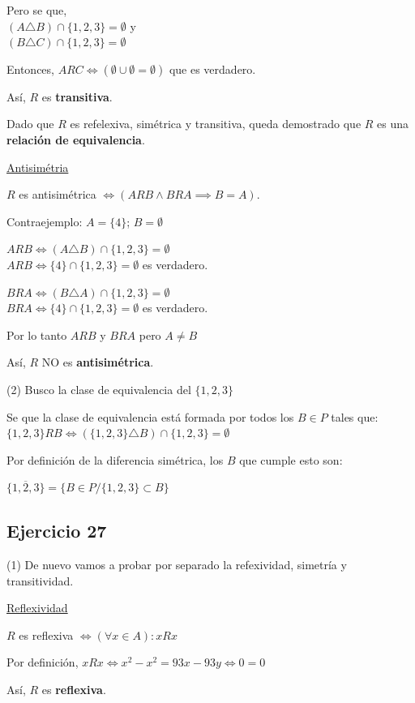 Pero se que, \\ $(A \triangle B) \cap \{ 1,2,3 \} = \emptyset$ y \\ $(B \triangle C) \cap \{ 1,2,3 \} = \emptyset$

Entonces, $ ARC \iff (\emptyset \cup \emptyset = \emptyset) $ que es verdadero.

Así, $R$ es \textbf{transitiva}.

Dado que $R$ es refelexiva, simétrica y transitiva, queda demostrado que $R$ es una \textbf{relación de equivalencia}.

\underline{Antisimétria}

$R$ es antisimétrica $\iff (ARB \wedge BRA \implies B=A)$.

Contraejemplo: $A = \{ 4 \}$; $B = \emptyset$

$ARB \iff (A \triangle B) \cap \{ 1,2,3 \} = \emptyset$ \\
$ARB \iff \{ 4 \} \cap \{ 1,2,3 \} = \emptyset$ es verdadero.

$BRA \iff (B \triangle A) \cap \{ 1,2,3 \} = \emptyset$ \\
$BRA \iff \{ 4 \} \cap \{ 1,2,3 \} = \emptyset$ es verdadero.

Por lo tanto $ARB$ y $BRA$ pero $A\neq B$

Así, $R$ NO es \textbf{antisimétrica}.

(2) Busco la clase de equivalencia del $\{ 1,2,3 \}$

Se que la clase de equivalencia está formada por todos los $B\in P$ tales que:\\
$\{ 1,2,3 \}RB \iff (\{ 1,2,3 \} \triangle B) \cap \{ 1,2,3 \} = \emptyset$

Por definición de la diferencia simétrica, los $B$ que cumple esto son:

$ \overline{\{ 1,2,3 \}} = \{B \in P / \{ 1,2,3 \} \subset B \}$

\subsection{Ejercicio 27}
(1) De nuevo vamos a probar por separado la refexividad, simetría y transitividad.

\underline{Reflexividad}

$R$ es reflexiva $\iff (\forall x \in A): xRx$

Por definición, $xRx \iff x^2 - x^2 = 93x - 93y \iff 0 = 0$

Así, $R$ es \textbf{reflexiva}.

